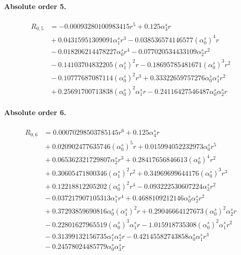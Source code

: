 \documentclass[10pt]{article}
\begin{document}
\paragraph{Absolute order 5.}
\begin{align*}
R_{0,5} &=  - 0.00093280100983415 r^{5} + 0.125 \alpha_{3}^s r \\
&{}  + 0.04315951309091 \alpha_{1}^s r^{3} - 0.038536574146577 \left(\alpha_{0}^s\right)^{4} r \\
&{}  - 0.018206214478227 \alpha_{0}^s r^{4} - 0.077020534433109 \alpha_{2}^s r^{2} \\
&{}  - 0.14103704832205 \left(\alpha_{1}^s\right)^{2} r - 0.18695785481671 \left(\alpha_{0}^s\right)^{3} r^{2} \\
&{}  - 0.10777687087114 \left(\alpha_{0}^s\right)^{2} r^{3} + 0.33322659757276 \alpha_{0}^s \alpha_{1}^s r^{2} \\
&{}  + 0.25691700713838 \left(\alpha_{0}^s\right)^{2} \alpha_{1}^s r - 0.24116427546487 \alpha_{0}^s \alpha_{2}^s r
\end{align*}

\paragraph{Absolute order 6.}
\begin{align*}
R_{0,6} &= 0.00070298503785145 r^{6} + 0.125 \alpha_{4}^s r \\
&{}  + 0.020902477635746 \left(\alpha_{0}^s\right)^{5} r + 0.015994052232973 \alpha_{0}^s r^{5} \\
&{}  + 0.065362321729807 \alpha_{2}^s r^{3} + 0.28417656846613 \left(\alpha_{0}^s\right)^{4} r^{2} \\
&{}  + 0.30605471800346 \left(\alpha_{1}^s\right)^{2} r^{2} + 0.34969699644176 \left(\alpha_{0}^s\right)^{3} r^{3} \\
&{}  + 0.12218812205202 \left(\alpha_{0}^s\right)^{2} r^{4} - 0.093222530607224 \alpha_{3}^s r^{2} \\
&{}  - 0.037217907105313 \alpha_{1}^s r^{4} + 0.4688109212146 \alpha_{0}^s \alpha_{2}^s r^{2} \\
&{}  + 0.37293859690816 \alpha_{0}^s \left(\alpha_{1}^s\right)^{2} r + 0.29046664127673 \left(\alpha_{0}^s\right)^{2} \alpha_{2}^s r \\
&{}  - 0.22801627965519 \left(\alpha_{0}^s\right)^{3} \alpha_{1}^s r - 1.015918735308 \left(\alpha_{0}^s\right)^{2} \alpha_{1}^s r^{2} \\
&{}  - 0.31399132156735 \alpha_{1}^s \alpha_{2}^s r - 0.42145582743858 \alpha_{0}^s \alpha_{1}^s r^{3} \\
&{}  - 0.24578024485779 \alpha_{0}^s \alpha_{3}^s r
\end{align*}
\end{document}
